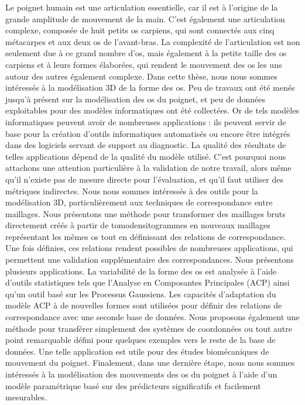 \begin{singlespace}
	
Le poignet humain est une articulation essentielle, car il est à l'origine de la grande amplitude de mouvement de la main. C'est également une articulation complexe, composée de huit petits os carpiens, qui sont connectés aux cinq métacarpes et aux deux os de l'avant-bras. La complexité de l'articulation est non seulement due à ce grand nombre d'os, mais également à la petite taille des os carpiens et à leurs formes élaborées, qui rendent le mouvement des os les uns autour des autres également complexe. Dans cette thèse, nous nous sommes intéressés à la modélisation 3D de la forme des os. Peu de travaux ont été menés jusqu'à présent sur la modélisation des os du poignet, et peu de données exploitables pour des modèles informatiques ont été collectées. Or de tels modèles informatiques peuvent avoir de nombreuses applications : ils peuvent servir de base pour la création d'outils informatiques automatisés ou encore être intégrés dans des logiciels servant de support au diagnostic. La qualité des résultats de telles applications dépend de la qualité du modèle utilisé. C'est pourquoi nous attachons une attention particulière à la validation de notre travail, alors même qu'il n'existe pas de mesure directe pour l'évaluation, et qu'il faut utiliser des métriques indirectes.
Nous nous sommes intéressés à des outils pour la modélisation 3D, particulièrement aux techniques de correspondance entre maillages. Nous présentons une méthode pour transformer des maillages bruts directement créés à partir de tomodensitogrammes en nouveaux maillages représentant les mêmes os tout en définissant des relations de correspondance.
Une fois définies, ces relations rendent possibles de nombreuses applications, qui permettent une validation supplémentaire des correspondances. Nous présentons plusieurs applications. La variabilité de la forme des os est analysée à l'aide d'outils statistiques tels que l'Analyse en Composantes Principales (ACP) ainsi qu'un outil basé sur les Processus Gaussiens.
Les capacités d'adaptation du modèle ACP à de nouvelles formes sont utilisées pour définir des relations de correspondance avec une seconde base de données. Nous proposons également une méthode pour transférer simplement des systèmes de coordonnées ou tout autre point remarquable défini pour quelques exemples vers le reste de la base de données. Une telle application est utile pour des études biomécaniques de mouvement du poignet. Finalement, dans une dernière étape, nous nous sommes intéressés à la modélisation des mouvements des os du poignet à l'aide d'un modèle paramétrique basé sur des prédicteurs significatifs et facilement mesurables.

\end{singlespace}